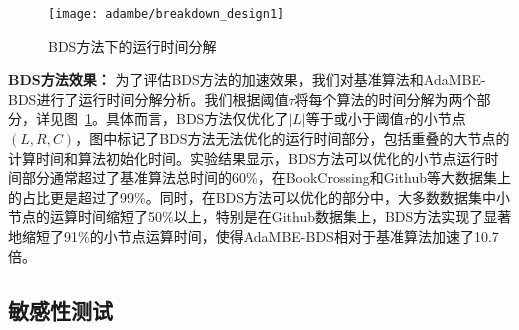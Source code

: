 \begin{figure} [t]
	\centering
	\texttt{[image: adambe/breakdown\_design1]}
	\caption{BDS方法下的运行时间分解}

	\label{fig:ada_breakdown_design1}
\end{figure}



\textbf{BDS方法效果：} 为了评估BDS方法的加速效果，我们对基准算法和AdaMBE-BDS进行了运行时间分解分析。我们根据阈值$\tau$将每个算法的时间分解为两个部分，详见图~\ref{fig:ada_breakdown_design1}。具体而言，BDS方法仅优化了$|L|$等于或小于阈值$\tau$的小节点$(L, R, C)$，图中标记了BDS方法无法优化的运行时间部分，包括重叠的大节点的计算时间和算法初始化时间。实验结果显示，BDS方法可以优化的小节点运行时间部分通常超过了基准算法总时间的60\%，在BookCrossing和Github等大数据集上的占比更是超过了99\%。同时，在BDS方法可以优化的部分中，大多数数据集中小节点的运算时间缩短了50\%以上，特别是在Github数据集上，BDS方法实现了显著地缩短了91\%的小节点运算时间，使得AdaMBE-BDS相对于基准算法加速了10.7倍。


\subsection{敏感性测试}
\label{subsec:ada_eval_sensitivity}

